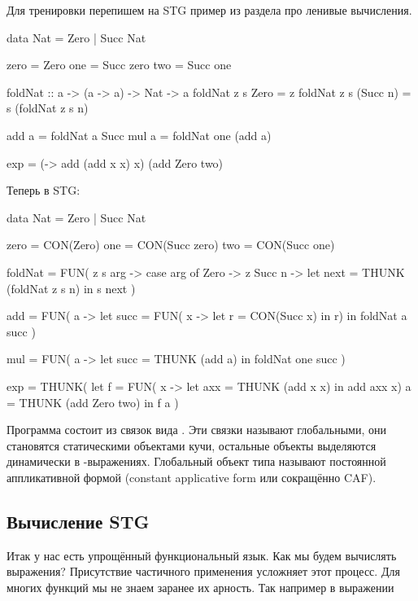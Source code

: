 Для тренировки перепишем на STG пример из раздела про ленивые вычисления.

\begin{code}
data Nat = Zero | Succ Nat

zero    = Zero
one     = Succ zero
two     = Succ one

foldNat :: a -> (a -> a) -> Nat -> a
foldNat z  s  Zero      = z
foldNat z  s  (Succ n)  = s (foldNat z s n)

add a = foldNat a   Succ
mul a = foldNat one (add a) 

exp = (\x -> add (add x x) x) (add Zero two)
\end{code}

Теперь в STG:

\begin{code}
data Nat = Zero | Succ Nat

zero    = CON(Zero)
one     = CON(Succ zero)
two     = CON(Succ one)

foldNat = FUN( z s arg -> 
            case arg of 
                Zero    -> z
                Succ n  -> let next = THUNK (foldNat z s n)
                           in  s next  
          )

add     = FUN( a ->
            let succ = FUN( x -> 
                        let r = CON(Succ x) 
                        in r)
            in  foldNat a succ
          )

mul     = FUN( a -> 
            let succ = THUNK (add a)
            in  foldNat one succ
          )

exp     = THUNK( 
            let f = FUN( x -> let axx = THUNK (add x x)
                              in  add axx x) 
                a = THUNK (add Zero two)
            in  f a    
          )
\end{code}    

Программа состоит из связок вида .
Эти связки называют глобальными, они становятся
статическими объектами кучи, остальные объекты
выделяются динамически в -выражениях.
Глобальный объект типа  называют 
постоянной аппликативной формой (constant applicative form или 
сокращённо CAF).

\subsection{Вычисление STG}

Итак у нас есть упрощённый функциональный язык. Как мы будем
вычислять выражения? Присутствие частичного применения усложняет
этот процесс. Для многих функций мы не знаем заранее их арность.
Так например в выражении

